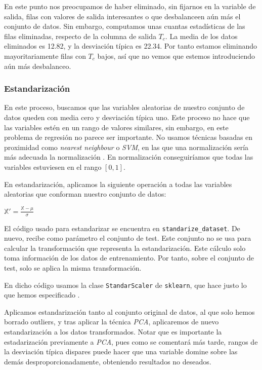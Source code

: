 \documentclass[11pt]{article}
\begin{document}
En este punto nos preocupamos de haber eliminado, sin fijarnos en la variable de salida, filas con valores de salida interesantes o que desbalanceen aún más el conjunto de datos. Sin embargo, computamos unas cuantas estadísticas de las filas eliminadas, respecto de la columna de salida $T_c$. La media de los datos eliminados es 12.82, y la desviación típica es 22.34. Por tanto estamos eliminando mayoritariamente filas con $T_c$ bajos, así que no vemos que estemos introduciendo aún más desbalanceo.

\subsubsection{Estandarización}

En este proceso, buscamos que las variables aleatorias de nuestro conjunto de datos queden con media cero y desviación típica uno. Este proceso no hace que las variables estén en un rango de valores similares, sin embargo, en este problema de regresión no parece ser importante. No usamos técnicas basadas en proximidad como \emph{nearest neighbour} o \emph{SVM}, en las que una normalización sería más adecuada la normalización \cite{normalization_vs_standarization:online}. En normalización conseguiríamos que todas las variables estuviesen en el rango $[0, 1]$.

En estandarización, aplicamos la siguiente operación a todas las variables aleatorias que conforman nuestro conjunto de datos:

$\mathbb{X'} = \frac{\mathbb{X} - \mu}{\sigma}$

El código usado para estandarizar se encuentra en \lstinline{standarize_dataset}. De nuevo, recibe como parámetro el conjunto de test. Este conjunto no se usa para calcular la transformación que representa la estandarización. Este cálculo solo toma información de los datos de entrenamiento. Por tanto, sobre el conjunto de test, solo se aplica la misma transformación.

En dicho código usamos la clase \lstinline{StandarScaler} de \lstinline{sklearn}, que hace justo lo que hemos especificado \cite{sklearn_std_scaler:online}.

Aplicamos estandarización tanto al conjunto original de datos, al que solo hemos borrado outliers, y tras aplicar la técnica \emph{PCA}, aplicaremos de nuevo estandarización a los datos transformados. Notar que es importante la estadarización previamente a \emph{PCA}, pues como se comentará más tarde, rangos de la desviación típica dispares puede hacer que una variable domine sobre las demás desproporcionadamente, obteniendo resultados no deseados.
\end{document}

